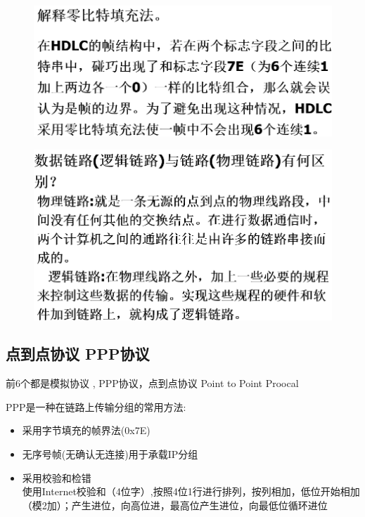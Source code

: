 \documentclass[UTF8,a4paper]{ctexart}
\begin{document}
\begin{figure}[H]
  \centering
  \includegraphics[scale = 0.3]{assets/jisuanjiwangluo_4517d.png}
\end{figure}

\begin{figure}[H]
  \centering
  \includegraphics[scale = 0.3]{assets/jisuanjiwangluo_dff1f.png}
\end{figure}

\subsection{点到点协议 PPP协议}
前6个都是模拟协议 , PPP协议，点到点协议 Point to Point Proocal

PPP是一种在链路上传输分组的常用方法:
\begin{itemize}
  \item 采用字节填充的帧界法(0x7E)
  \item 无序号帧(无确认无连接)用于承载IP分组
  \item 采用校验和检错\\
  使用Internet校验和（4位字）,按照4位1行进行排列，按列相加，低位开始相加（模2加）；产生进位，向高位进，最高位产生进位，向最低位循环进位
\end{itemize}
\end{document}
